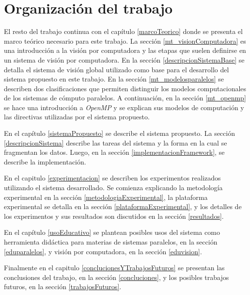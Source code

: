 
\section{Organización del trabajo}

El resto del trabajo continua con el capítulo \ref{marcoTeorico} donde se
presenta el marco teórico necesario para este trabajo. La sección
\ref{mt_visionComputadora} es una introducción a la visión por computadora y las
etapas que suelen definirse en un sistema de visión por computadora. En la
sección \ref{descripcionSistemaBase} se detalla el sistema de visión global
utilizado como base para el desarrollo del sistema propuesto en este trabajo.
En la sección \ref{mt_modelosparalelos} se describen dos clasificaciones que
permiten distinguir los modelos computacionales de los sistemas de cómputo
paralelos. A continuación, en la sección \ref{mt_openmp} se hace una
introducción a \emph{OpenMP} y se explican sus modelos de computación y las
directivas utilizadas por el sistema propuesto.

En el capítulo \ref{sistemaPropuesto} se describe el sistema propuesto. La
sección \ref{descripcionSistema} describe las tareas del sistema y la forma en
la cual se fragmentan los datos. Luego, en la sección
\ref{implementacionFramework}, se describe la implementación.

En el capitulo \ref{experimentacion} se describen los experimentos realizados
utilizando el sistema desarrollado. Se comienza explicando la metodología
experimental en la sección \ref{metodologiaExperimental}, la plataforma
experimental se detalla en la sección \ref{plataformaExperimental}, y los
detalles de los experimentos y sus resultados son discutidos en la sección
\ref{resultados}.

En el capítulo \ref{usoEducativo} se plantean posibles usos del sistema como
herramienta didáctica para materias de sistemas paralelos, en la sección
\ref{eduparalelos}, y visión por computadora, en la sección \ref{eduvision}.

Finalmente en el capitulo \ref{conclucionesYTrabajosFuturos} se presentan las
conclusiones del trabajo, en la sección \ref{concluciones}, y los posibles
trabajos futuros, en la sección \ref{trabajosFuturos}.
